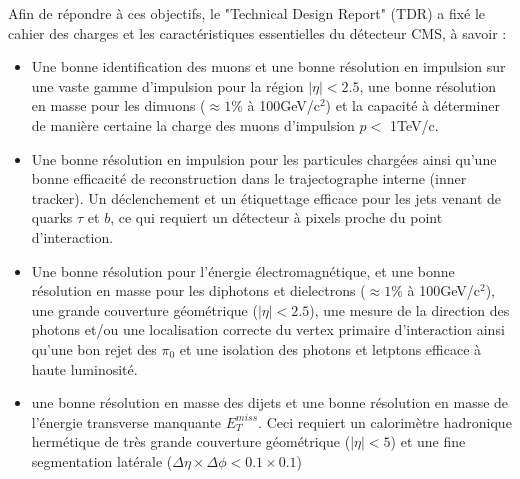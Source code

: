 Afin de répondre à ces objectifs, le "Technical Design Report" (TDR) \cite{Bayatian:922757} a fixé le cahier des charges et les caractéristiques essentielles du détecteur CMS, à savoir :
\begin{itemize}[label=$\bullet$]
	\item Une bonne identification des muons et une bonne résolution en impulsion sur une vaste gamme d'impulsion pour la région $|\eta|<2.5$, une bonne résolution en masse pour les dimuons ($\approx 1\%$ à 100GeV/c$^{2}$) et la capacité à déterminer de manière certaine la charge des muons d'impulsion $p<$ 1TeV/c.
	\item Une bonne résolution en impulsion pour les particules chargées ainsi qu'une bonne efficacité de reconstruction dans le trajectographe interne (inner tracker). Un déclenchement et un étiquettage efficace pour les jets venant de quarks $\tau$ et $b$, ce qui requiert un détecteur à pixels proche du point d'interaction.
	\item Une bonne résolution pour l'énergie électromagnétique, et une bonne résolution en masse pour les diphotons et dielectrons  ($\approx 1\%$ à 100GeV/c$^{2}$), une grande couverture géométrique ($|\eta|<2.5$), une mesure de la direction des photons et/ou une localisation correcte du vertex primaire d'interaction ainsi qu'une bon rejet des $\pi_{0}$ et une isolation des photons et letptons efficace à haute luminosité.
	\item une bonne résolution en masse des dijets et une bonne résolution en masse de l'énergie transverse manquante $E_{T}^{miss}$. Ceci requiert un calorimètre hadronique hermétique de très grande couverture géométrique ($|\eta|<5$) et une fine segmentation latérale ($\Delta\eta\times\Delta\phi<0.1\times0.1$)
\end{itemize} 

